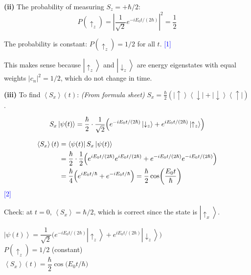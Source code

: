 \documentclass[12pt,a4paper]{article}
\newcommand{\markstep}[1]{\hfill\textcolor{blue}{[#1]}}
\newcommand{\finalanswer}[1]{%
  \begin{tcolorbox}[colback=green!5!white,colframe=green!50!black,boxrule=0.5pt]
  #1
  \end{tcolorbox}
}
\newcommand{\fromsheet}{\textit{(From formula sheet)}}
\renewcommand{\ket}[1]{\left|#1\right\rangle}
\renewcommand{\bra}[1]{\left\langle #1\right|}
\renewcommand{\ketbra}[2]{\left|#1\right\rangle\!\left\langle #2\right|}
\renewcommand{\expect}[1]{\left\langle #1\right\rangle}
\begin{document}
\begin{parts}
\textbf{(ii)} The probability of measuring $S_z = +\hbar/2$:
\[
P(\uparrow_z) = \left|\frac{1}{\sqrt{2}}e^{-iE_0 t/(2\hbar)}\right|^2 = \frac{1}{2}
\]

The probability is constant: $P(\uparrow_z) = 1/2$ for all $t$. \markstep{1}

This makes sense because $\ket{\uparrow_z}$ and $\ket{\downarrow_z}$ are energy eigenstates with equal weights $|c_n|^2 = 1/2$, which do not change in time.

\textbf{(iii)} To find $\expect{S_x}(t)$: \fromsheet{} $S_x = \frac{\hbar}{2}(\ketbra{\uparrow}{\downarrow} + \ketbra{\downarrow}{\uparrow})$.

\[
S_x\ket{\psi(t)} = \frac{\hbar}{2} \cdot \frac{1}{\sqrt{2}}\Bigl(e^{-iE_0 t/(2\hbar)}\ket{\downarrow_z} + e^{iE_0 t/(2\hbar)}\ket{\uparrow_z}\Bigr)
\]

\begin{align*}
\expect{S_x}(t) &= \bra{\psi(t)}S_x\ket{\psi(t)} \\
&= \frac{\hbar}{2}\cdot\frac{1}{2}\Bigl(e^{iE_0 t/(2\hbar)}e^{iE_0 t/(2\hbar)} + e^{-iE_0 t/(2\hbar)}e^{-iE_0 t/(2\hbar)}\Bigr) \\
&= \frac{\hbar}{4}\Bigl(e^{iE_0 t/\hbar} + e^{-iE_0 t/\hbar}\Bigr) = \frac{\hbar}{2}\cos\!\left(\frac{E_0 t}{\hbar}\right)
\end{align*}
\markstep{2}

Check: at $t = 0$, $\expect{S_x} = \hbar/2$, which is correct since the state is $\ket{\uparrow_x}$. \checkmark

\finalanswer{$\ket{\psi(t)} = \dfrac{1}{\sqrt{2}}\bigl(e^{-iE_0 t/(2\hbar)}\ket{\uparrow_z} + e^{iE_0 t/(2\hbar)}\ket{\downarrow_z}\bigr)$\\[6pt]
$P(\uparrow_z) = 1/2$ (constant)\\[6pt]
$\expect{S_x}(t) = \dfrac{\hbar}{2}\cos\!\bigl(E_0 t/\hbar\bigr)$}

\end{parts}
\end{document}

